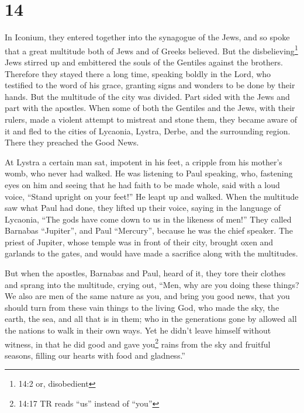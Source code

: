 \hypertarget{section-13}{%
\section{14}\label{section-13}}

 In Iconium, they entered together into the synagogue of the
Jews, and so spoke that a great multitude both of Jews and of Greeks
believed.  But the disbelieving\footnote{14:2 or,
  disobedient} Jews stirred up and embittered the souls of the Gentiles
against the brothers.  Therefore they stayed there a long
time, speaking boldly in the Lord, who testified to the word of his
grace, granting signs and wonders to be done by their hands.
 But the multitude of the city was divided. Part sided with
the Jews and part with the apostles.  When some of both the
Gentiles and the Jews, with their rulers, made a violent attempt to
mistreat and stone them,  they became aware of it and fled
to the cities of Lycaonia, Lystra, Derbe, and the surrounding region.
 There they preached the Good News.

 At Lystra a certain man sat, impotent in his feet, a
cripple from his mother's womb, who never had walked.  He
was listening to Paul speaking, who, fastening eyes on him and seeing
that he had faith to be made whole,  said with a loud
voice, ``Stand upright on your feet!'' He leapt up and walked.
 When the multitude saw what Paul had done, they lifted up
their voice, saying in the language of Lycaonia, ``The gods have come
down to us in the likeness of men!''  They called Barnabas
``Jupiter'', and Paul ``Mercury'', because he was the chief speaker.
 The priest of Jupiter, whose temple was in front of their
city, brought oxen and garlands to the gates, and would have made a
sacrifice along with the multitudes.

 But when the apostles, Barnabas and Paul, heard of it,
they tore their clothes and sprang into the multitude, crying out,
 ``Men, why are you doing these things? We also are men of
the same nature as you, and bring you good news, that you should turn
from these vain things to the living God, who made the sky, the earth,
the sea, and all that is in them;  who in the generations
gone by allowed all the nations to walk in their own ways. 
Yet he didn't leave himself without witness, in that he did good and
gave you\footnote{14:17 TR reads ``us'' instead of ``you''} rains from
the sky and fruitful seasons, filling our hearts with food and
gladness.''

